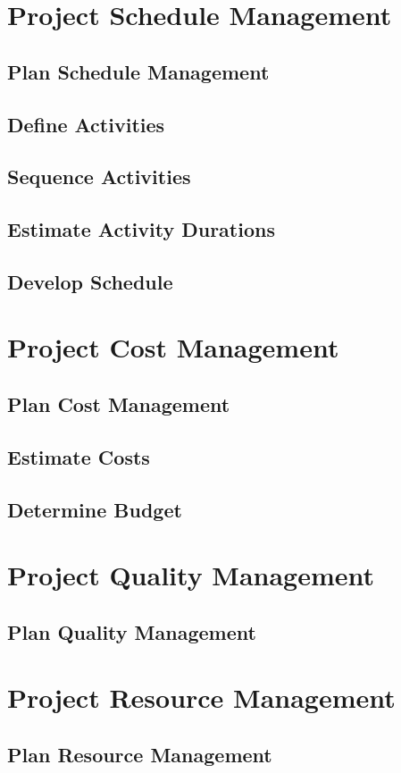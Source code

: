 \documentclass[12pt,letterpaper]{report}
\begin{document}
	\chapter{Project Schedule Management}
	\section{Plan Schedule Management}
	\section{Define Activities}
	\section{Sequence Activities}
	\section{Estimate Activity Durations}
	\section{Develop Schedule}
	\chapter{Project Cost Management}
	\section{Plan Cost Management}
	\section{Estimate Costs}
	\section{Determine Budget}
	\chapter{Project Quality Management}
	\section{Plan Quality Management}
	\chapter{Project Resource Management}
	\section{Plan Resource Management}
\end{document}
